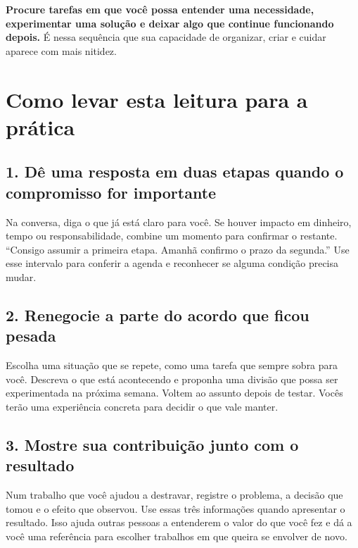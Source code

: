 \textbf{Procure tarefas em que você possa entender uma necessidade, experimentar uma solução e deixar algo que continue funcionando depois.} É nessa sequência que sua capacidade de organizar, criar e cuidar aparece com mais nitidez.

\clearpage
\section*{Como levar esta leitura para a prática}

\subsection*{1. Dê uma resposta em duas etapas quando o compromisso for importante}
Na conversa, diga o que já está claro para você. Se houver impacto em dinheiro, tempo ou responsabilidade, combine um momento para confirmar o restante. “Consigo assumir a primeira etapa. Amanhã confirmo o prazo da segunda.” Use esse intervalo para conferir a agenda e reconhecer se alguma condição precisa mudar.

\subsection*{2. Renegocie a parte do acordo que ficou pesada}
Escolha uma situação que se repete, como uma tarefa que sempre sobra para você. Descreva o que está acontecendo e proponha uma divisão que possa ser experimentada na próxima semana. Voltem ao assunto depois de testar. Vocês terão uma experiência concreta para decidir o que vale manter.

\subsection*{3. Mostre sua contribuição junto com o resultado}
Num trabalho que você ajudou a destravar, registre o problema, a decisão que tomou e o efeito que observou. Use essas três informações quando apresentar o resultado. Isso ajuda outras pessoas a entenderem o valor do que você fez e dá a você uma referência para escolher trabalhos em que queira se envolver de novo.
